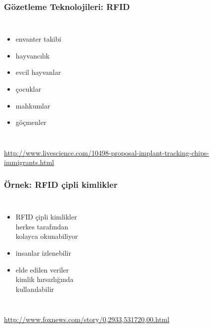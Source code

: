 \documentclass[dvipsnames]{beamer}
\theoremstyle{definition}
\theoremstyle{example}
\theoremstyle{plain}
\begin{document}
\begin{frame}
  \frametitle{Gözetleme Teknolojileri: RFID}

  \begin{columns}
    \begin{itemize}
      \item envanter takibi
      \item hayvancılık

      \pause
      \medskip
      \item evcil hayvanlar
      \item çocuklar
      \item mahkumlar
      \item göçmenler
    \end{itemize}

  \end{columns}

  \medskip
  \tiny{\url{http://www.livescience.com/10498-proposal-implant-tracking-chips-immigrants.html}}\\
\end{frame}

\begin{frame}
  \frametitle{Örnek: RFID çipli kimlikler}

  \begin{columns}

    \begin{itemize}
      \item RFID çipli kimlikler\\
        herkes tarafından\\
        kolayca okunabiliyor
      \item insanlar izlenebilir
      \item elde edilen veriler\\
        kimlik hırsızlığında\\
        kullanılabilir
    \end{itemize}
  \end{columns}

  \medskip
  \tiny{\url{http://www.foxnews.com/story/0,2933,531720,00.html}}\\
\end{frame}
\end{document}
